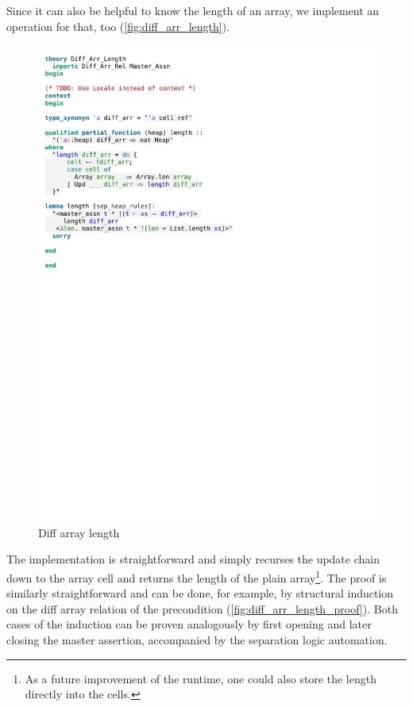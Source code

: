 Since it can also be helpful to know the length of an array, we implement an operation for that, too (\autoref{fig:diff_arr_length}).

\begin{figure}[htpb]
    \includegraphics[trim={0 20,2cm 0 5,2cm}, clip, width=1.00\textwidth]{figures/Theory_Diff_Arr_Length.pdf}
    \caption[Diff array length]{Diff array length}
    \label{fig:diff_arr_length}
\end{figure}

\noindent The implementation is straightforward and simply recurses the update chain down to the array cell and returns the length of the plain array\footnote{As a future improvement of the runtime, one could also store the length directly into the cells.}. The proof is similarly straightforward and can be done, for example, by structural induction on the diff array relation of the precondition (\autoref{fig:diff_arr_length_proof}). Both cases of the induction can be proven analogously by first opening and later closing the master assertion, accompanied by the separation logic automation.

